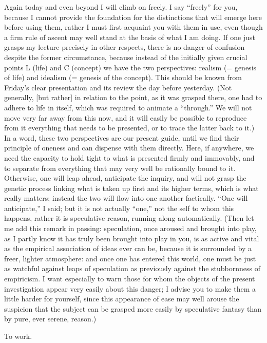 Again today and even beyond I will climb on freely.
I say “freely” for you, because
I cannot provide the foundation for the distinctions
that will emerge here before using them,
rather I must first acquaint you with them in use,
even though a firm rule of ascent may well stand
at the basis of what I am doing.
If one just grasps my lecture precisely in other respects,
there is no danger of confusion despite the former circumstance,
because instead of the initially given crucial points
L (life) and C (concept)
we have the two perspectives:
realism (= genesis of life) and
idealism (= genesis of the concept).
This should be known from Friday's clear presentation
and its review the day before yesterday.
(Not generally, [but rather] in relation to the point,
as it was grasped there, one had to adhere to life in itself,
which was required to animate a “through.”
We will not move very far away from this now,
and it will easily be possible to reproduce from it
everything that needs to be presented,
or to trace the latter back to it.)
In a word, these two perspectives are our present guide,
until we find their principle of oneness
and can dispense with them directly.
Here, if anywhere, we need the capacity
to hold tight to what is presented firmly and immovably,
and to separate from everything that may
very well be rationally bound to it.
Otherwise, one will leap ahead, anticipate the inquiry,
and will not grasp the genetic process
linking what is taken up first and its higher terms,
which is what really matters;
instead the two will flow into one another factically.
“One will anticipate,” I said;
but it is not actually “one,”
not the self to whom this happens,
rather it is speculative reason,
running along automatically.
(Then let me add this remark in passing:
speculation, once aroused and brought into play,
as I partly know it has truly been brought into play in you,
is as active and vital as the empirical association of ideas ever can be,
because it is surrounded by a freer, lighter atmosphere:
and once one has entered this world,
one must be just as watchful against
leaps of speculation as previously against
the stubbornness of empiricism.
I want especially to warn those for whom the objects
of the present investigation appear very easily about this danger;
I advise you to make them a little harder for yourself,
since this appearance of ease may well arouse the suspicion
that the subject can be grasped more easily by speculative fantasy
than by pure, ever serene, reason.)

To work.

